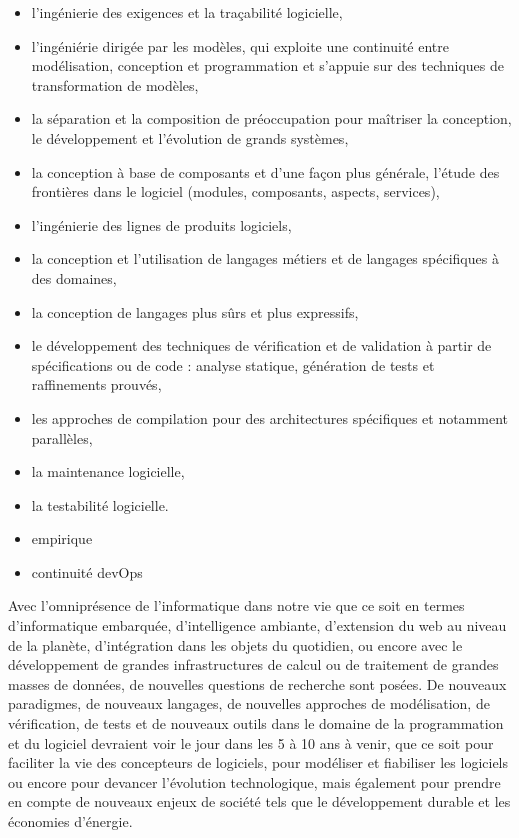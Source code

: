 \documentclass[11pt]{article}
\begin{document}
\begin{itemize}
\item l'ingénierie des exigences et la traçabilité logicielle,
\item l'ingéniérie dirigée par les modèles, qui exploite une continuité entre
  modélisation, conception et programmation  et s'appuie sur des techniques de
  transformation de modèles,
\item la séparation et la composition de préoccupation pour maîtriser la conception, le développement et l'évolution de grands systèmes,
\item la conception à base de composants et d'une façon plus générale, l'étude
  des frontières dans le logiciel (modules, composants, aspects, services),
\item l'ingénierie des lignes de produits logiciels,
\item la conception et l'utilisation de langages métiers et de langages
  spécifiques à des domaines,
\item la conception de langages plus sûrs et plus expressifs,
\item le développement des techniques de vérification et de validation à partir
  de spécifications ou de code : analyse statique, génération de tests et
  raffinements prouvés,
\item les approches de compilation pour des architectures spécifiques et notamment parallèles,
\item la maintenance logicielle,
\item la testabilité logicielle.
\item empirique
\item continuité devOps
\end{itemize}
\medskip
\noindent
Avec l'omniprésence de l'informatique dans notre vie que ce soit en termes
d'informatique embarquée, d'intelligence ambiante, d'extension du web au niveau
de la planète, d'intégration dans les objets du quotidien, ou encore avec le
développement de grandes infrastructures de calcul ou de traitement de grandes
masses de données, de nouvelles questions de recherche sont posées.
De nouveaux paradigmes, de nouveaux langages, de nouvelles approches de
modélisation, de vérification, de tests et de nouveaux outils dans le domaine
de la programmation et du logiciel devraient voir le jour dans les 5 à 10 ans à
venir, que ce soit pour faciliter la vie des concepteurs de logiciels, pour
modéliser et fiabiliser les logiciels ou encore pour devancer l'évolution
technologique, mais également pour prendre en compte de nouveaux enjeux de
société tels que le développement durable et les économies d'énergie. 
\end{document}
